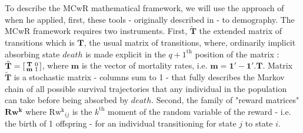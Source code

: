 \documentclass[10pt,a4paper]{article}
\begin{document}
To describe the MCwR mathematical framework, we will use the approach of \citet{Caswell2011b} when he applied, first, these tools - originally described in \citep{Howard1960,Hatori1966}- to demography. 
The MCwR framework requires two instruments.
First,  $\tilde{\mathbf{T}}$ the extended matrix of transitions which is $\mathbf{T}$, the usual matrix of transitions, where, ordinarily implicit absorbing state $death$ is made explicit in the $q+1^{\mathrm{th}}$ position of the matrix : $\tilde{\mathbf{T}}= \begin{bsmallmatrix} \mathbf{T} & 0 \\ \textbf{m} & 1 \end{bsmallmatrix} $, where $\mathbf{m}$ is the vector of mortality rates, i.e. $\mathbf{m}=\mathbf{1'-1'.T}$. Matrix $\tilde{\mathbf{T}}$ is a stochastic matrix - columns sum to 1 - that fully describes the Markov chain of all possible survival trajectories that any individual in the population can take before being absorbed by $death$.
Second, the family of "reward matrices" $\mathbf{Rw^{k}}  $ where $\mathrm{Rw^{k}}_{ij}  $ is the $k^{\mathrm{th}}$ moment of the random variable of the reward - i.e. the birth of 1 offspring - for an individual transitioning for state $j$ to state $i$.\\
\end{document}
